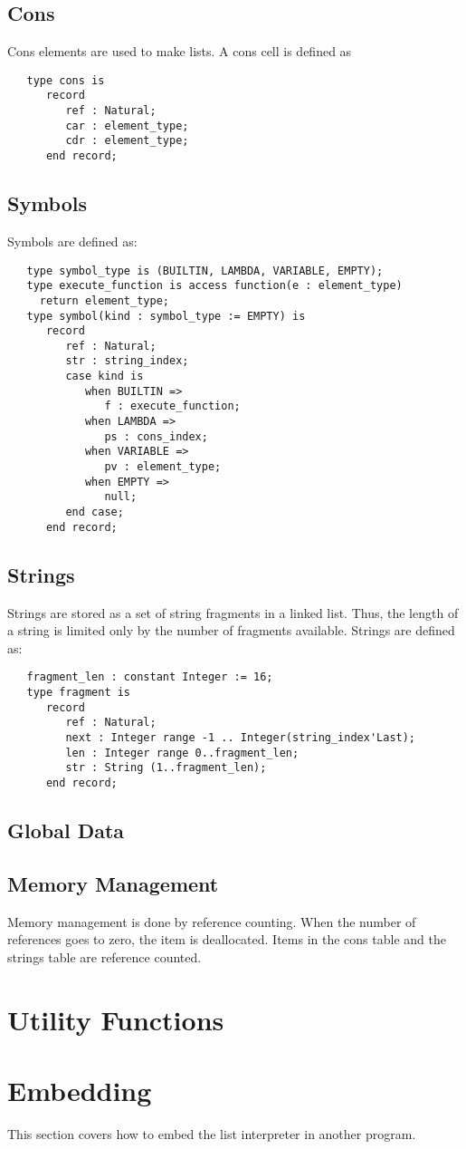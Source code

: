 \documentclass[10pt, openany]{book}
\begin{document}
\subsection{Cons}
Cons elements are used to make lists.  A cons cell is defined as
\begin{lstlisting}
   type cons is
      record
         ref : Natural;
         car : element_type;
         cdr : element_type;
      end record;
\end{lstlisting}

\subsection{Symbols}
Symbols are defined as:
\begin{lstlisting}
   type symbol_type is (BUILTIN, LAMBDA, VARIABLE, EMPTY);
   type execute_function is access function(e : element_type)
     return element_type;
   type symbol(kind : symbol_type := EMPTY) is
      record
         ref : Natural;
         str : string_index;
         case kind is
            when BUILTIN =>
               f : execute_function;
            when LAMBDA =>
               ps : cons_index;
            when VARIABLE =>
               pv : element_type;
            when EMPTY =>
               null;
         end case;
      end record;
\end{lstlisting}

\subsection{Strings}
Strings are stored as a set of string fragments in a linked list.  Thus, the length of a string is limited only by the number of fragments available.  Strings are defined as:
\begin{lstlisting}
   fragment_len : constant Integer := 16;
   type fragment is
      record
         ref : Natural;
         next : Integer range -1 .. Integer(string_index'Last);
         len : Integer range 0..fragment_len;
         str : String (1..fragment_len);
      end record;
\end{lstlisting}

\subsection{Global Data}

\subsection{Memory Management}
Memory management is done by reference counting.  When the number of references goes to zero, the item is deallocated.  Items in the cons table and the strings table are reference counted.

\section{Utility Functions}

\section{Embedding}
This section covers how to embed the list interpreter in another program.
\end{document}
